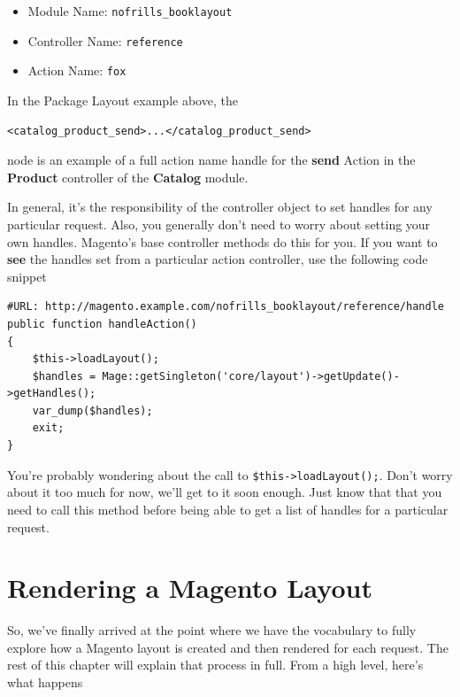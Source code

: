 \documentclass[oneside]{book}
\begin{document}
\begin{itemize}
\item Module Name: \footnotesize\texttt{nofrills\_booklayout} \normalsize
\item Controller Name: \footnotesize\texttt{reference} \normalsize
\item Action Name: \footnotesize\texttt{fox} \normalsize
\end{itemize}


In the Package Layout example above, the

\begin{lstlisting}
<catalog_product_send>...</catalog_product_send>

\end{lstlisting}


node is an example of a full action name handle for the \textbf{send} Action in the \textbf{Product} controller of the \textbf{Catalog} module.

In general, it's the responsibility of the controller object to set handles for any particular request.  Also, you generally don't need to worry about setting your own handles.  Magento's base controller methods do this for you.  If you want to \textbf{see} the handles set from a particular action controller, use the following code snippet

\begin{lstlisting}
#URL: http://magento.example.com/nofrills_booklayout/reference/handle
public function handleAction()
{
    $this->loadLayout();
    $handles = Mage::getSingleton('core/layout')->getUpdate()->getHandles();
    var_dump($handles);
    exit;
}

\end{lstlisting}


You're probably wondering about the call to \footnotesize\texttt{\$this-\textgreater loadLayout();}\normalsize. Don't worry about it too much for now, we'll get to it soon enough.  Just know that that you need to call this method before being able to get a list of handles for a particular request.

\section{Rendering a Magento Layout}

So, we've finally arrived at the point where we have the vocabulary to fully explore how a Magento layout is created and then rendered for each request.  The rest of this chapter will explain that process in full.  From a high level, here's what happens
\end{document}
